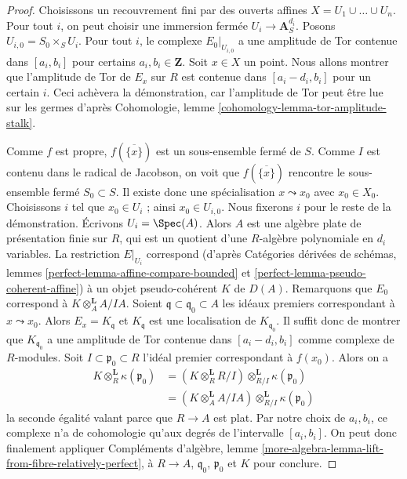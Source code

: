 \begin{proof}
Choisissons un recouvrement fini par des ouverts affines $X = U_1 \cup \ldots \cup U_n$.
Pour tout $i$, on peut choisir une immersion fermée $U_i \to \mathbf{A}^{d_i}_S$.
Posons $U_{i, 0} = S_0 \times_S U_i$.
Pour tout $i$, le complexe $E_0|_{U_{i, 0}}$ a une amplitude de Tor
contenue dans $[a_i, b_i]$ pour certains $a_i, b_i \in \mathbf{Z}$.
Soit $x \in X$ un point.
Nous allons montrer que l'amplitude de Tor de
$E_x$ sur $R$ est contenue dans $[a_i - d_i, b_i]$ pour un certain $i$.
Ceci achèvera la démonstration, car l'amplitude de Tor peut être
lue sur les germes d'après
Cohomologie, lemme \ref{cohomology-lemma-tor-amplitude-stalk}.

\medskip\noindent
Comme $f$ est propre, $f(\overline{\{x\}})$ est un sous-ensemble fermé de $S$.
Comme $I$ est contenu dans le radical de Jacobson, on voit que
$f(\overline{\{x\}})$ rencontre le sous-ensemble fermé $S_0 \subset S$.
Il existe donc une spécialisation $x \leadsto x_0$ avec $x_0 \in X_0$.
Choisissons $i$ tel que $x_0 \in U_i$ ; ainsi $x_0 \in U_{i, 0}$.
Nous fixerons $i$ pour le reste de la démonstration.
Écrivons $U_i = \Spec(A)$. Alors $A$ est une algèbre plate de présentation
finie sur $R$, qui est un quotient d'une $R$-algèbre polynomiale en
$d_i$ variables. La restriction $E|_{U_i}$ correspond
(d'après Catégories dérivées de schémas, lemmes
\ref{perfect-lemma-affine-compare-bounded} et
\ref{perfect-lemma-pseudo-coherent-affine})
à un objet pseudo-cohérent $K$ de $D(A)$.
Remarquons que $E_0$ correspond à $K \otimes_A^\mathbf{L} A/IA$.
Soient $\mathfrak q \subset \mathfrak q_0 \subset A$ les idéaux
premiers correspondant à $x \leadsto x_0$.
Alors $E_x = K_{\mathfrak q}$ et $K_{\mathfrak q}$
est une localisation de $K_{\mathfrak q_0}$. Il suffit donc
de montrer que $K_{\mathfrak q_0}$ a une amplitude de Tor contenue dans
$[a_i - d_i, b_i]$ comme complexe de $R$-modules.
Soit $I \subset \mathfrak p_0 \subset R$ l'idéal
premier correspondant à $f(x_0)$.
Alors on a
\begin{align*}
K \otimes_R^\mathbf{L} \kappa(\mathfrak p_0)
& =
(K \otimes_R^\mathbf{L} R/I) \otimes_{R/I}^\mathbf{L}
\kappa(\mathfrak p_0) \\
& =
(K \otimes_A^\mathbf{L} A/IA) \otimes_{R/I}^\mathbf{L} \kappa(\mathfrak p_0)
\end{align*}
la seconde égalité valant parce que $R \to A$ est plat.
Par notre choix de $a_i, b_i$, ce complexe n'a de cohomologie
qu'aux degrés de l'intervalle $[a_i, b_i]$.
On peut donc finalement appliquer
Compléments d'algèbre, lemme
\ref{more-algebra-lemma-lift-from-fibre-relatively-perfect},
à $R \to A$, $\mathfrak q_0$, $\mathfrak p_0$ et $K$
pour conclure.
\end{proof}










